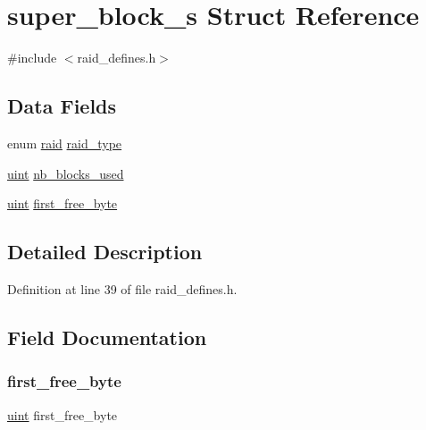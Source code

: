 \hypertarget{structsuper__block__s}{}\section{super\+\_\+block\+\_\+s Struct Reference}
\label{structsuper__block__s}


{\ttfamily \#include $<$raid\+\_\+defines.\+h$>$}

\subsection*{Data Fields}
\begin{DoxyCompactItemize}
\item 
enum \hyperlink{raid__defines_8h_a7a2279e0841d50aa8e976d3bb0eb3a6e}{raid} \hyperlink{structsuper__block__s_a531486677d7c826dad518c717abcd4ed}{raid\+\_\+type}
\item 
\hyperlink{raid__defines_8h_a91ad9478d81a7aaf2593e8d9c3d06a14}{uint} \hyperlink{structsuper__block__s_a471e84cd18cb41ccc12b4e188c003694}{nb\+\_\+blocks\+\_\+used}
\item 
\hyperlink{raid__defines_8h_a91ad9478d81a7aaf2593e8d9c3d06a14}{uint} \hyperlink{structsuper__block__s_a8fcb4bf17f15b15d1e43aec5a7b22f3f}{first\+\_\+free\+\_\+byte}
\end{DoxyCompactItemize}


\subsection{Detailed Description}


Definition at line 39 of file raid\+\_\+defines.\+h.



\subsection{Field Documentation}
\mbox{\label{structsuper__block__s_a8fcb4bf17f15b15d1e43aec5a7b22f3f}} 
\subsubsection{\texorpdfstring{first\+\_\+free\+\_\+byte}{first\_free\_byte}}
{\footnotesize\ttfamily \hyperlink{raid__defines_8h_a91ad9478d81a7aaf2593e8d9c3d06a14}{uint} first\+\_\+free\+\_\+byte}



